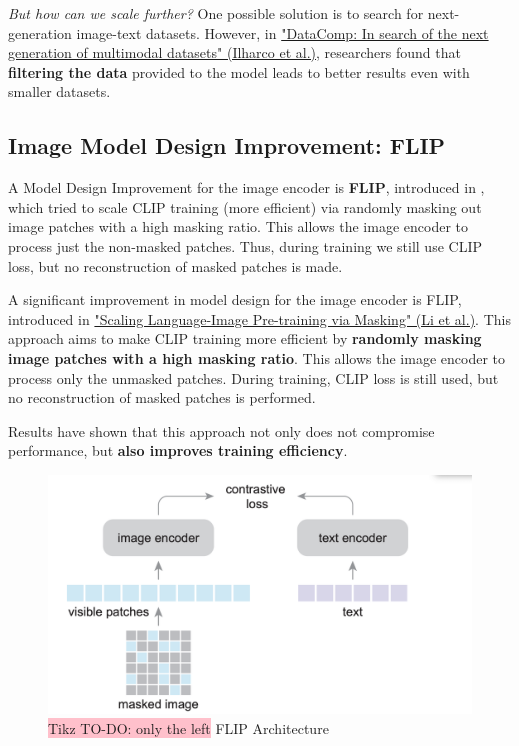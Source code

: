\textit{But how can we scale further?} One possible solution is to search for next-generation image-text datasets. However, in \href{https://arxiv.org/pdf/2304.14108}{"DataComp: In search of the next generation of multimodal datasets" (Ilharco et al.)}, researchers found that \textbf{filtering the data} provided to the model leads to better results even with smaller datasets.


\subsection{Image Model Design Improvement: FLIP}



A Model Design Improvement for the image encoder is \textbf{FLIP}, introduced in , which tried to scale CLIP training (more efficient) via randomly masking out image patches with a high masking ratio. This allows the image encoder to process just the non-masked patches. Thus, during training we still use CLIP loss, but no reconstruction of masked patches is made.

A significant improvement in model design for the image encoder is FLIP, introduced in \href{https://arxiv.org/pdf/2212.00794}{"Scaling Language-Image Pre-training via Masking" (Li et al.)}. This approach aims to make CLIP training more efficient by \textbf{randomly masking image patches with a high masking ratio}. This allows the image encoder to process only the unmasked patches. During training, CLIP loss is still used, but no reconstruction of masked patches is performed.

Results have shown that this approach not only does not compromise performance, but \textbf{also improves training efficiency}.

\begin{figure}[!htbp]
    \centering
    \includegraphics[width=0.8\linewidth]{tikz/chapter11 - FLIP.png}
    \caption{{\color{red}\colorbox{pink}{Tikz TO-DO: only the left}} FLIP Architecture}
\end{figure}

